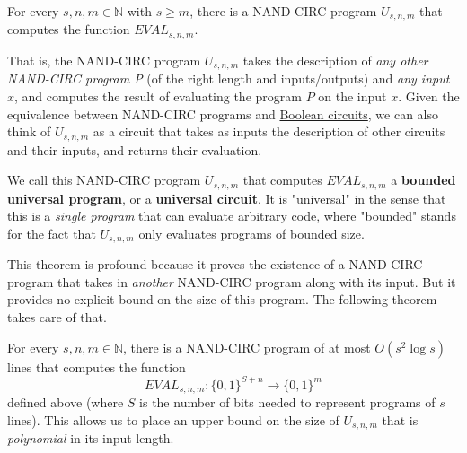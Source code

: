   \begin{theorem}
    \label{thm:existence-of-a-bounded-universal-program}
  For every $s, n, m \in \mathbb{N}$ with $s \geq m$, there is a NAND-CIRC program $U_{s, n, m}$ that computes the function $EVAL_{s, n, m}$. 
  \end{theorem}

  That is, the NAND-CIRC program $U_{s, n, m}$ takes the description of \textit{any other NAND-CIRC program P} (of the right length and inputs/outputs) and \textit{any input $x$}, and computes the result of evaluating the program $P$ on the input $x$. Given the equivalence between NAND-CIRC programs and \hyperref[def:boolean-circuit]{Boolean circuits}, we can also think of $U_{s, n, m}$ as a circuit that takes as inputs the description of other circuits and their inputs, and returns their evaluation. 

  \begin{definition}
    \label{def:bounded-universal-program}
  We call this NAND-CIRC program $U_{s, n, m}$ that computes $EVAL_{s, n, m}$ a \textbf{bounded universal program}, or a \textbf{universal circuit}. It is "universal" in the sense that this is a \textit{single program} that can evaluate arbitrary code, where "bounded" stands for the fact that $U_{s, n, m}$ only evaluates programs of bounded size. 
  \end{definition}

  This theorem is profound because it proves the existence of a NAND-CIRC program that takes in \textit{another} NAND-CIRC program along with its input. But it provides no explicit bound on the size of this program. The following theorem takes care of that. 

  \begin{theorem}
    \label{thm:efficient-bounded-universality-of-nand-circ}
  For every $s, n, m \in \mathbb{N}$, there is a NAND-CIRC program of at most $O(s^2 \log s)$ lines that computes the function 
  \begin{equation}
    EVAL_{s, n, m}: \{0,1\}^{S+n} \to \{0,1\}^m
  \end{equation}
  defined above (where $S$ is the number of bits needed to represent programs of $s$ lines). This allows us to place an upper bound on the size of $U_{s, n, m}$ that is \textit{polynomial} in its input length. 
  \end{theorem}


